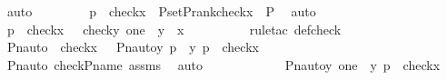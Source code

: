 \begin{isabellebody}
\ auto\ \isanewline
\ \ \ \ \isamarkupfalse%
\ \isamarkupfalse%
\ p{}\ {\isacharcolon}{\kern0pt}\ {\isachardoublequoteopen}check{\isacharparenleft}{\kern0pt}x{\isacharparenright}{\kern0pt}\ {\isasymsubseteq}\ P{\isacharunderscore}{\kern0pt}set{\isacharparenleft}{\kern0pt}P{\isacharunderscore}{\kern0pt}rank{\isacharparenleft}{\kern0pt}check{\isacharparenleft}{\kern0pt}x{\isacharparenright}{\kern0pt}{\isacharparenright}{\kern0pt}{\isacharparenright}{\kern0pt}\ {\isasymtimes}\ P{\isachardoublequoteclose}\ \isamarkupfalse%
\ auto\ \isanewline
\ \ \ \ \isamarkupfalse%
\ p{}\ {\isacharcolon}{\kern0pt}\ {\isachardoublequoteopen}check{\isacharparenleft}{\kern0pt}x{\isacharparenright}{\kern0pt}\ {\isacharequal}{\kern0pt}\ {\isacharbraceleft}{\kern0pt}\ {\isacharless}{\kern0pt}check{\isacharparenleft}{\kern0pt}y{\isacharparenright}{\kern0pt}{\isacharcomma}{\kern0pt}\ one{\isachargreater}{\kern0pt}\ {\isachardot}{\kern0pt}\ y\ {\isasymin}\ x\ {\isacharbraceright}{\kern0pt}{\isachardoublequoteclose}\ \isanewline
\ \ \ \ \ \ \isamarkupfalse%
\ {\isacharparenleft}{\kern0pt}rule{\isacharunderscore}{\kern0pt}tac\ def{\isacharunderscore}{\kern0pt}check{\isacharparenright}{\kern0pt}\isanewline
\ \ \ \ \isamarkupfalse%
\ {\isachardoublequoteopen}Pn{\isacharunderscore}{\kern0pt}auto{\isacharparenleft}{\kern0pt}{\isasympi}{\isacharparenright}{\kern0pt}\ {\isacharbackquote}{\kern0pt}\ check{\isacharparenleft}{\kern0pt}x{\isacharparenright}{\kern0pt}\ {\isacharequal}{\kern0pt}\ {\isacharbraceleft}{\kern0pt}\ {\isacharless}{\kern0pt}Pn{\isacharunderscore}{\kern0pt}auto{\isacharparenleft}{\kern0pt}{\isasympi}{\isacharparenright}{\kern0pt}{\isacharbackquote}{\kern0pt}y{\isacharcomma}{\kern0pt}\ {\isasympi}{\isacharbackquote}{\kern0pt}p{\isachargreater}{\kern0pt}\ {\isachardot}{\kern0pt}\ {\isacharless}{\kern0pt}y{\isacharcomma}{\kern0pt}\ p{\isachargreater}{\kern0pt}\ {\isasymin}\ check{\isacharparenleft}{\kern0pt}x{\isacharparenright}{\kern0pt}\ {\isacharbraceright}{\kern0pt}{\isachardoublequoteclose}\isanewline
\ \ \ \ \ \ \isamarkupfalse%
\ Pn{\isacharunderscore}{\kern0pt}auto\ check{\isacharunderscore}{\kern0pt}P{\isacharunderscore}{\kern0pt}name\ assms\ \isamarkupfalse%
\ auto\ \isanewline
\ \ \ \ \isamarkupfalse%
\ \isamarkupfalse%
\ {\isachardoublequoteopen}{\isachardot}{\kern0pt}{\isachardot}{\kern0pt}{\isachardot}{\kern0pt}\ {\isacharequal}{\kern0pt}\ \ {\isacharbraceleft}{\kern0pt}\ {\isacharless}{\kern0pt}Pn{\isacharunderscore}{\kern0pt}auto{\isacharparenleft}{\kern0pt}{\isasympi}{\isacharparenright}{\kern0pt}{\isacharbackquote}{\kern0pt}y{\isacharcomma}{\kern0pt}\ {\isasympi}{\isacharbackquote}{\kern0pt}one{\isachargreater}{\kern0pt}\ {\isachardot}{\kern0pt}\ {\isacharless}{\kern0pt}y{\isacharcomma}{\kern0pt}\ p{\isachargreater}{\kern0pt}\ {\isasymin}\ check{\isacharparenleft}{\kern0pt}x{\isacharparenright}{\kern0pt}\ {\isacharbraceright}{\kern0pt}{\isachardoublequoteclose}\isanewline

\end{isabellebody}
